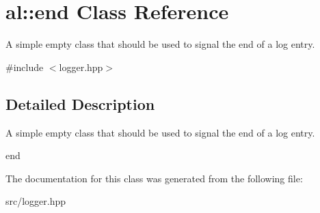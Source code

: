 \hypertarget{classal_1_1end}{\section{al\-:\-:end \-Class \-Reference}
\label{classal_1_1end}
}


\-A simple empty class that should be used to signal the end of a log entry.  




{\ttfamily \#include $<$logger.\-hpp$>$}



\subsection{\-Detailed \-Description}
\-A simple empty class that should be used to signal the end of a log entry. 

end 

\-The documentation for this class was generated from the following file\-:\begin{DoxyCompactItemize}
\item 
src/logger.\-hpp\end{DoxyCompactItemize}
